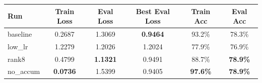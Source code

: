 \begin{tabular}{@{}lccccc@{}}
\toprule
\textbf{Run} & \textbf{Train Loss} & \textbf{Eval Loss} & \textbf{Best Eval Loss} & \textbf{Train Acc} & \textbf{Eval Acc} \\
\midrule
baseline  & 0.2687 & 1.3069 & \textbf{0.9464} & 93.2\% & 78.3\% \\
low\_lr   & 1.2279 & 1.2026 & 1.2024          & 77.9\% & 76.9\% \\
rank8     & 0.4799 & \textbf{1.1321} & 0.9491  & 88.7\% & \textbf{78.9\%} \\
no\_accum & \textbf{0.0736} & 1.5399 & 0.9405  & \textbf{97.6\%} & \textbf{78.9\%} \\
\bottomrule
\end{tabular}

